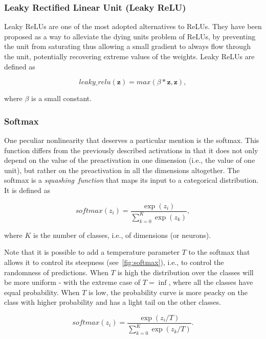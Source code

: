 \subsubsection{Leaky Rectified Linear Unit (Leaky ReLU)}\label{sec:lrelu}
Leaky ReLUs are one of the most adopted alternatives to ReLUs. They have been
proposed as a way to alleviate the dying units problem of ReLUs, by preventing
the unit from saturating thus allowing a small gradient to always flow through
the unit, potentially recovering extreme values of the weights. Leaky ReLUs are
defined as

\begin{equation}\label{eq:lrelu}
    leaky\_relu(\mathbf{z}) = max(\beta*\mathbf{z}, \mathbf{z}),
\end{equation}

\noindent where $\beta$ is a small constant.

\subsubsection{Softmax}\label{sec:softmax}
One peculiar nonlinearity that deserves a particular mention is the softmax.
This function differs from the previously described activations in that it
does not only depend on the value of the preactivation in one dimension (i.e.,
the value of one unit), but rather on the preactivation in all the dimensions
altogether. The softmax is a \emph{squashing~function} that maps its input to a
categorical distribution. It is defined as

\begin{equation}\label{eq:softmax}
    softmax(z_i) = \frac{\exp(z_i)}{\sum_{k=0}^K{\exp(z_k)}},
\end{equation}

\noindent where $K$ is the number of classes, i.e., of dimensions (or neurons).

Note that it is possible to add a temperature parameter $T$ to the softmax that
allows it to control its steepness (see~\autoref{fig:softmax}), i.e., to
control the randomness of predictions. When $T$ is high the distribution over
the classes will be more uniform - with the extreme case of $T = \inf$, where
all the classes have equal probability. When $T$ is low, the probability curve
is more peacky on the class with higher probability and has a light tail on the
other classes.

\begin{equation}\label{eq:softmax_tmp}
    softmax(z_i) = \frac{\exp(z_i / T)}
                        {\sum_{k=0}^K{\exp(z_k / T)}}.
\end{equation}

